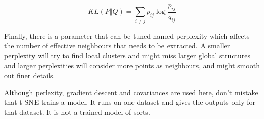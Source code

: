 \begin{definition}
  \begin{displaymath}
    KL(P \Vert Q) = \sum_{i \neq j} p_{ij} \log{\frac{p_{ij}}{q_{ij}}}
  \end{displaymath}
\end{definition}

Finally, there is a parameter that can be tuned named
perplexity which affects the number of effective neighbours
that needs to be extracted. A smaller perplexity will try to
find local clusters and might miss larger global structures
and larger perplexities will consider more points as neighbours,
and might smooth out finer details.

\begin{note}
  Although perlexity, gradient descent and covariances are used
  here, don't mistake that t-SNE trains a model. It runs on one
  dataset and gives the outputs only for that dataset. It is not
  a trained model of sorts.
\end{note}
